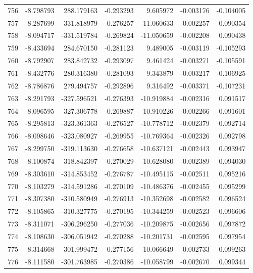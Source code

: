 \begin{tabular}{rrrrrrr}
 756 &  -8.798793 &  288.179163 & -0.293293 &   9.605972 &  -0.003176 & -0.104005 \\
 757 &  -8.287699 & -331.818979 & -0.276257 & -11.060633 &  -0.002257 &  0.090354 \\
 758 &  -8.094717 & -331.519784 & -0.269824 & -11.050659 &  -0.002208 &  0.090438 \\
 759 &  -8.433694 &  284.670150 & -0.281123 &   9.489005 &  -0.003119 & -0.105293 \\
 760 &  -8.792907 &  283.842732 & -0.293097 &   9.461424 &  -0.003271 & -0.105591 \\
 761 &  -8.432776 &  280.316380 & -0.281093 &   9.343879 &  -0.003217 & -0.106925 \\
 762 &  -8.786876 &  279.494757 & -0.292896 &   9.316492 &  -0.003371 & -0.107231 \\
 763 &  -8.291793 & -327.596521 & -0.276393 & -10.919884 &  -0.002316 &  0.091517 \\
 764 &  -8.096595 & -327.306778 & -0.269887 & -10.910226 &  -0.002266 &  0.091601 \\
 765 &  -8.295813 & -323.361363 & -0.276527 & -10.778712 &  -0.002379 &  0.092714 \\
 766 &  -8.098646 & -323.080927 & -0.269955 & -10.769364 &  -0.002326 &  0.092798 \\
 767 &  -8.299750 & -319.113630 & -0.276658 & -10.637121 &  -0.002443 &  0.093947 \\
 768 &  -8.100874 & -318.842397 & -0.270029 & -10.628080 &  -0.002389 &  0.094030 \\
 769 &  -8.303610 & -314.853452 & -0.276787 & -10.495115 &  -0.002511 &  0.095216 \\
 770 &  -8.103279 & -314.591286 & -0.270109 & -10.486376 &  -0.002455 &  0.095299 \\
 771 &  -8.307380 & -310.580949 & -0.276913 & -10.352698 &  -0.002582 &  0.096524 \\
 772 &  -8.105865 & -310.327775 & -0.270195 & -10.344259 &  -0.002523 &  0.096606 \\
 773 &  -8.311071 & -306.296250 & -0.277036 & -10.209875 &  -0.002656 &  0.097872 \\
 774 &  -8.108630 & -306.051942 & -0.270288 & -10.201731 &  -0.002595 &  0.097954 \\
 775 &  -8.314668 & -301.999472 & -0.277156 & -10.066649 &  -0.002733 &  0.099263 \\
 776 &  -8.111580 & -301.763985 & -0.270386 & -10.058799 &  -0.002670 &  0.099344 \\

\end{tabular}
